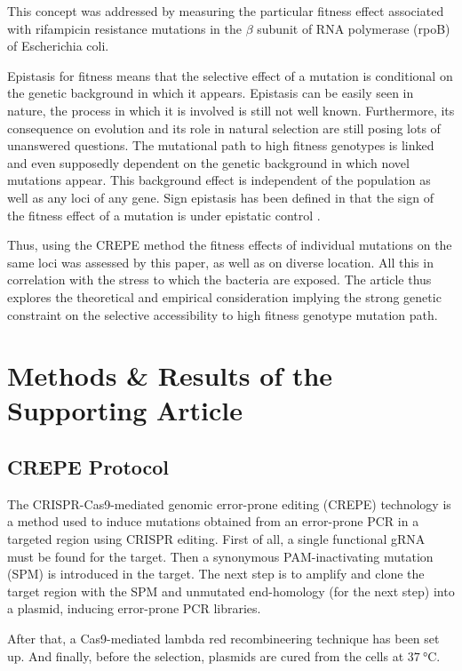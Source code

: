\documentclass[12pt]{article}
\begin{document}
  This concept was addressed by measuring the particular fitness effect
  associated with rifampicin resistance mutations in the $\beta$ subunit of
  RNA polymerase (rpoB) of Escherichia coli. 

  Epistasis for fitness means that the selective effect of a mutation is
  conditional on the genetic background in which it appears. Epistasis can be
  easily seen in nature, the process in which it is involved is still not well
  known. Furthermore, its consequence on evolution and its role in natural
  selection are still posing lots of unanswered questions. The mutational path
  to high fitness genotypes is linked and even supposedly dependent on the
  genetic background in which novel mutations appear. This background effect is
  independent of the population as well as any loci of any gene. Sign epistasis
  has been defined in that the sign of the fitness effect of a mutation is
  under epistatic control \cite{garst2017genome}. 

  Thus, using the CREPE method the fitness effects of individual mutations on
  the same loci was assessed by this paper, as well as on diverse location. All
  this in correlation with the stress to which the bacteria are exposed. The
  article thus explores the theoretical and empirical consideration implying
  the strong genetic constraint on the selective accessibility to high fitness
  genotype mutation path.

  \section{Methods \& Results of the Supporting Article}

  \subsection{CREPE Protocol}

  The CRISPR-Cas9-mediated genomic error-prone editing (CREPE) technology is a
  method used to induce mutations obtained from an error-prone PCR in a
  targeted region using CRISPR editing. First of all, a single functional gRNA
  must be found for the target. Then a synonymous PAM-inactivating mutation
  (SPM) is introduced in the target. The next step is to amplify and clone the
  target region with the SPM and unmutated end-homology (for the next step)
  into a plasmid, inducing error-prone PCR libraries.

  After that, a Cas9-mediated lambda red recombineering technique has been set
  up. And finally, before the selection, plasmids are cured from the cells at
  $\SI{37}{\celsius}$.
\end{document}
